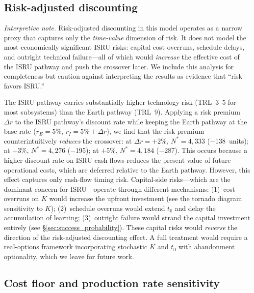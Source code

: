 \documentclass[preprint,12pt]{elsarticle}
\begin{document}
\subsection{Risk-adjusted discounting}
\label{sec:risk_premium}

\emph{Interpretive note.} Risk-adjusted discounting in this model operates as a narrow proxy that captures only the \emph{time-value} dimension of risk. It does not model the most economically significant ISRU risks: capital cost overruns, schedule delays, and outright technical failure---all of which would \emph{increase} the effective cost of the ISRU pathway and push the crossover later. We include this analysis for completeness but caution against interpreting the results as evidence that ``risk favors ISRU.''

The ISRU pathway carries substantially higher technology risk (TRL~3--5 for most subsystems) than the Earth pathway (TRL~9). Applying a risk premium $\Delta r$ to the ISRU pathway's discount rate while keeping the Earth pathway at the base rate ($r_E = 5\%$, $r_I = 5\% + \Delta r$), we find that the risk premium counterintuitively \emph{reduces} the crossover: at $\Delta r = +2\%$, $N^* = 4{,}333$ ($-$138~units); at $+3\%$, $N^* = 4{,}276$ ($-$195); at $+5\%$, $N^* = 4{,}184$ ($-$287). This occurs because a higher discount rate on ISRU cash flows reduces the present value of future operational costs, which are deferred relative to the Earth pathway. However, this effect captures only cash-flow timing risk. Capital-side risks---which are the dominant concern for ISRU---operate through different mechanisms: (1)~cost overruns on $K$ would increase the upfront investment (see the tornado diagram sensitivity to $K$); (2)~schedule overruns would extend $t_0$ and delay the accumulation of learning; (3)~outright failure would strand the capital investment entirely (see \S\ref{sec:success_probability}). These capital risks would \emph{reverse} the direction of the risk-adjusted discounting effect. A full treatment would require a real-options framework \cite{dixit1994} incorporating stochastic $K$ and $t_0$ with abandonment optionality, which we leave for future work.

\subsection{Cost floor and production rate sensitivity}
\label{sec:cfloor_prodrate}
\end{document}
